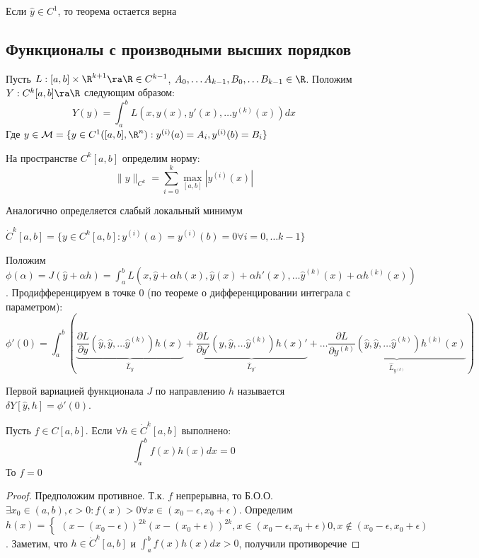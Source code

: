 \begin{note}
    Если \(\hat{y} \in C^1\), то теорема остается верна
\end{note}

\subsection{Функционалы с производными высших порядков}
Пусть \(L: [a, b] \times \R^{k + 1} \ra \R \in C^{k - 1}\), \(A_0, \dots A_{k - 1}, B_0, \dots B_{k - 1} \in \R\). Положим \(Y: C^k[a, b] \ra \R\) следующим образом:
\[Y(y) = \int_a^b L(x, y(x), y'(x), \dots y^{(k)}(x))dx\]
Где \(y \in \mathcal{M} = \{y \in C^1([a, b], \R^n): y^{(i)}(a) = A_i, y^{(i)}(b) = B_i\}\)
\begin{definition}
    На пространстве \(C^k[a, b]\) определим норму:
    \[\|y\|_{C^k} = \sum_{i = 0}^k \max_{[a, b]}|y^{(i)}(x)|\]
\end{definition}

Аналогично определяется слабый локальный минимум

\begin{definition}
    \(\dot{C}^k[a, b] = \{y \in C^k[a, b]: y^{(i)}(a) = y^{(i)}(b) = 0 \forall i = 0, \dots k - 1\}\)
\end{definition}

Положим \(\phi(\alpha) = J(\hat{y} + \alpha h) = \int_a^b L(x, \hat{y} + \alpha h(x), \hat{y}(x) + \alpha h'(x), \dots \hat{y}^{(k)}(x) + \alpha h^{(k)}(x))\). Продифференцируем в точке \(0\) (по теореме о дифференцировании интеграла с параметром):
\[\phi'(0) = \int_a^b \left( \underbrace{\frac{\partial L}{\partial y}(\hat{y}, \hat{y}, \dots \hat{y}^{(k)})h(x)}_{\widehat{L}_y} + \underbrace{\frac{\partial L}{\partial y'}(\hat{y}, \hat{y}, \dots \hat{y}^{(k)})h(x)'}_{\widehat{L}_{y'}} + \dots \underbrace{\frac{\partial L}{\partial y^{(k)}}(\hat{y}, \hat{y}, \dots \hat{y}^{(k)})h^{(k)}(x)}_{\widehat{L}_{y^{(k)}}}\right)\]

\begin{definition}
    Первой вариацией функционала \(J\) по направлению \(h\) называется \(\delta Y[\hat{y}, h] = \phi'(0)\).
\end{definition}

\begin{lemma}[Лагранжа]
    Пусть \(f \in C[a, b]\). Если \(\forall h \in \dot{C}^k[a, b]\) выполнено:
    \[\int_a^b f(x)h(x)dx = 0\]
    То \(f = 0\)
\end{lemma}
\begin{proof}
    Предположим противное. Т.к. \(f\) непрерывна, то Б.О.О. \(\exists x_0 \in (a, b), \epsilon > 0: f(x) > 0 \forall x \in (x_0 - \epsilon, x_0 + \epsilon)\). Определим \(h(x) = \left\{\begin{array}{l}
        (x - (x_0 - \epsilon))^{2k}(x - (x_0 + \epsilon))^{2k}, x \in (x_0 - \epsilon, x_0 + \epsilon)
        0, x \notin (x_0 - \epsilon, x_0 + \epsilon)
    \end{array}\right.\). Заметим, что \(h \in \dot{C}^k[a, b]\) и \(\int_a^b f(x)h(x)dx > 0\), получили противоречие
\end{proof}

